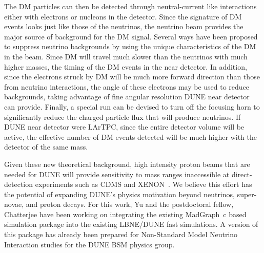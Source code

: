 The DM particles can then be detected through neutral-current like interactions either with electrons or nucleons in the detector. Since the signature of DM events looks just like those of the neutrinos, the neutrino beam provides the major source of background for the DM signal. Several ways have been proposed to suppress neutrino backgrounds by using the unique characteristics of the DM in the beam. Since DM will travel much slower than the neutrinos with much higher masses, the timing of the DM events in the near detector.  In addition, since the electrons struck by DM will be much more forward direction than those from neutrino interactions, the angle of these electrons may be used to reduce backgrounds, taking advantage of fine angular resolution DUNE near detector can provide. Finally, a special run can be devised to turn off the focusing horn to significantly reduce the charged particle flux that will produce neutrinos. If DUNE near detector were LArTPC, since the entire detector volume will be active, the effective number of DM events detected will be much higher with the detector of the same mass. 

Given these new theoretical background, high intensity proton beams that are needed for DUNE will provide sensitivity to mass ranges inaccessible at direct-detection experiments such as CDMS and XENON~\cite{Aprile:2012nq}.  
We believe this effort has the potential of expanding DUNE's physics motivation beyond neutrinos, super-novae, and proton decays. For this work, Yu and the postdoctoral fellow, Chatterjee have been working on integrating the existing MadGraph~c\cite{if:madDraph} based simulation package into the existing LBNE/DUNE fast simulations. A version of this package has already been prepared for Non-Standard Model Neutrino Interaction studies for the DUNE BSM physics group.

